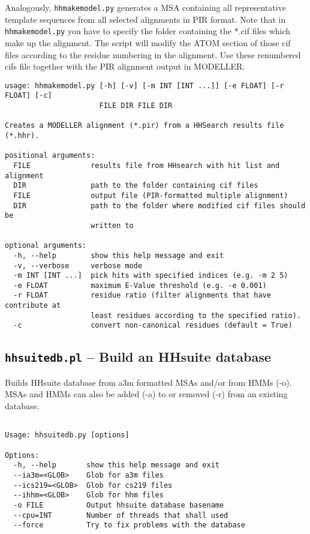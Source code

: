 \documentclass[11pt,a4paper]{article}
\begin{document}
Analogously, \verb`hhmakemodel.py` generates a MSA containing all representative template sequences from all selected alignments in PIR format. Note that in \verb`hhmakemodel.py` you have to specify the folder containing the *.cif files which make up the alignment. The script will modify the ATOM section of those cif files according to the residue numbering in the alignment. Use these renumbered cifs file together with the PIR alignment output in MODELLER\cite{Sali:1993}.

\small
\begin{verbatim}
usage: hhmakemodel.py [-h] [-v] [-m INT [INT ...]] [-e FLOAT] [-r FLOAT] [-c]
                      FILE DIR FILE DIR

Creates a MODELLER alignment (*.pir) from a HHSearch results file (*.hhr).

positional arguments:
  FILE              results file from HHsearch with hit list and alignment
  DIR               path to the folder containing cif files
  FILE              output file (PIR-formatted multiple alignment)
  DIR               path to the folder where modified cif files should be
                    written to

optional arguments:
  -h, --help        show this help message and exit
  -v, --verbose     verbose mode
  -m INT [INT ...]  pick hits with specified indices (e.g. -m 2 5)
  -e FLOAT          maximum E-Value threshold (e.g. -e 0.001)
  -r FLOAT          residue ratio (filter alignments that have contribute at
                    least residues according to the specified ratio).
  -c                convert non-canonical residues (default = True)
\end{verbatim} 
\normalsize

\subsection{{\tt hhsuitedb.pl} -- Build an HHsuite database }

Builds HHsuite database from a3m formatted MSAs and/or from HMMs (-o).
MSAs and HMMs can also be added (-a) to or removed (-r) from an existing database. 

\small 
\begin{verbatim}

Usage: hhsuitedb.py [options]

Options:
  -h, --help       show this help message and exit
  --ia3m=<GLOB>    Glob for a3m files
  --ics219=<GLOB>  Glob for cs219 files
  --ihhm=<GLOB>    Glob for hhm files
  -o FILE          Output hhsuite database basename
  --cpu=INT        Number of threads that shall used
  --force          Try to fix problems with the database

\end{verbatim} 
\normalsize
\end{document}
